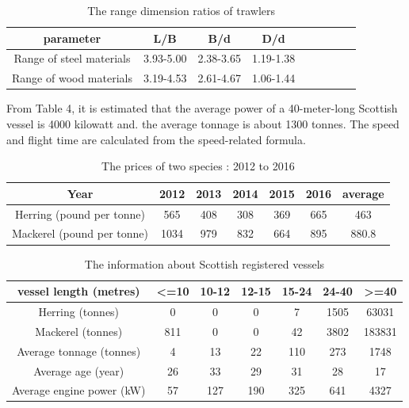 \documentclass{mcmthesis}
\begin{document}
\begin{table}[!htb]
  \centering
  \setlength{\abovecaptionskip}{0pt}%
  \setlength{\belowcaptionskip}{15pt}%
  \caption{The range dimension ratios of  trawlers}
  \begin{tabular}{ccccccccc}
  \toprule[1.5pt]
  parameter &L/B&B/d&D/d\\
  \toprule[1.5pt]
  Range of steel materials&3.93-5.00&2.38-3.65&1.19-1.38\\
  Range of wood materials&3.19-4.53&2.61-4.67&1.06-1.44\\
  \bottomrule[1.5pt]
  \end{tabular}
  \end{table}

From Table 4, it is estimated that the average power of a 40-meter-long Scottish vessel is 4000 kilowatt and. the average tonnage is about 1300 tonnes. The speed and flight time are calculated from the speed-related formula.



\begin{table}[!htb]
\centering
\setlength{\abovecaptionskip}{0pt}%
\setlength{\belowcaptionskip}{13pt}%
\caption{The prices of two species : 2012 to 2016}
\begin{tabular}{ccccccc}
\toprule[1.5pt]
Year&2012&2013&2014&2015&2016&average\\
\bottomrule[1.5pt]
Herring (pound  per tonne)  &565&408&308&369&665&463\\
Mackerel (pound  per tonne)  &1034&979&832&664&895&880.8\\
\bottomrule[1.5pt]
\end{tabular}
\end{table}


\begin{table}[!htb]
\centering
\setlength{\abovecaptionskip}{0pt}%
\setlength{\belowcaptionskip}{13pt}%
\caption{The information about Scottish registered vessels}
\begin{tabular}{ccccccc}
\toprule[1.5pt]
vessel length (metres)&<=10&10-12&12-15&15-24&24-40&>=40\\
\bottomrule[1.5pt]
Herring (tonnes)&0&0&0&7&1505&63031\\
Mackerel (tonnes) &811&0&0&42&3802&183831\\
Average tonnage (tonnes)&4&13&22&110&273&1748\\
Average age (year)&26&33&29&31&28&17\\
Average engine power (kW)&57&127&190&325&641&4327\\

\bottomrule[1.5pt]
\end{tabular}
\end{table}
\end{document}
